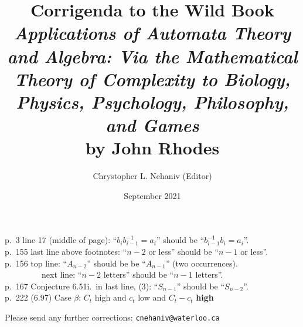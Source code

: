\documentclass{article}
\title{Corrigenda to the Wild Book\\[1em]
{\em Applications of Automata Theory and Algebra: Via the Mathematical Theory of Complexity to Biology, Physics, Psychology, Philosophy, and Games} \\[1em] by John Rhodes}
\author{Chrystopher L. Nehaniv (Editor)}
\date{September 2021}
\begin{document}
\maketitle



p.\ 3 line 17 (middle of page):   ``$b_i b_{i-1}^{-1}=a_i$'' should be ``$b_{i-1}^{-1} b_i=a_i$''. \\

p.\ 155 last line above footnotes:   ``$n-2$ or less'' should be ``$n-1$ or less''.\\

p.\ 156 top line: ``$A_{n-2}$'' should be be ``$A_{n-1}$'' (two occurrences).\\

\ \ \ \ \ \ \ \ \  next line:  ``$n-2$ letters'' should be ``$n-1$ letters''.\\
 
p.\ 167 Conjecture 6.51i.\ in last line,  (3):   ``$S_{n-1}$'' should be ``$S_{n-2}$''.  \\


p.\ 222 (6.97) Case $\beta$:  $C_t$ high and $c_t$ low and $C_t-c_t$ {\bf high}

\vfill
Please send any further corrections:  {\tt cnehaniv@waterloo.ca}
\end{document}
